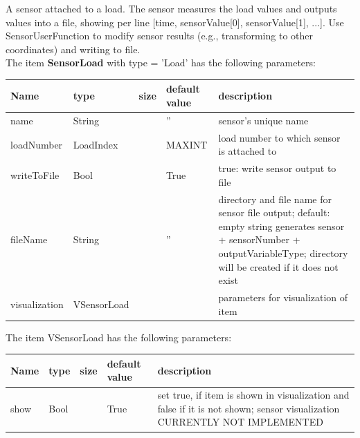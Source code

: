 \label{sec:item:SensorLoad}
A sensor attached to a load. The sensor measures the load values and outputs values into a file, showing per line [time, sensorValue[0], sensorValue[1], ...]. Use SensorUserFunction to modify sensor results (e.g., transforming to other coordinates) and writing to file.\vspace{12pt}
 \\\vspace{12pt} \noindent The item {\bf SensorLoad} with type = 'Load' has the following parameters:\vspace{-1cm}\\ 
\begin{center}
  \footnotesize
  \begin{longtable}{| p{4.5cm} | p{2.5cm} | p{0.5cm} | p{2.5cm} | p{6cm} |}
    \hline
    \bf Name & \bf type & \bf size & \bf default value & \bf description \\ \hline
    name &     String &      &     '' &     sensor's unique name\\ \hline
    loadNumber &     LoadIndex &      &     MAXINT &     load number to which sensor is attached to\\ \hline
    writeToFile &     Bool &      &     True &     true: write sensor output to file\\ \hline
    fileName &     String &      &     '' &     directory and file name for sensor file output; default: empty string generates sensor + sensorNumber + outputVariableType; directory will be created if it does not exist\\ \hline
    visualization & VSensorLoad & & & parameters for visualization of item \\ \hline
	  \end{longtable}
	\end{center}
The item VSensorLoad has the following parameters:\vspace{-1cm}\\ 
\begin{center}
  \footnotesize
  \begin{longtable}{| p{4.5cm} | p{2.5cm} | p{0.5cm} | p{2.5cm} | p{6cm} |}
    \hline
    \bf Name & \bf type & \bf size & \bf default value & \bf description \\ \hline
    show &     Bool &      &     True &     set true, if item is shown in visualization and false if it is not shown; sensor visualization CURRENTLY NOT IMPLEMENTED\\ \hline
	  \end{longtable}
	\end{center}
